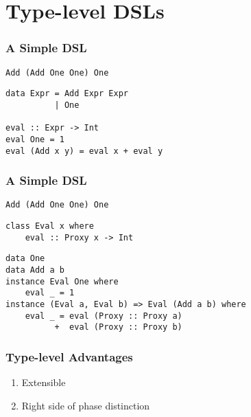 \documentclass{beamer}
\begin{document}
\section{Type-level DSLs}

\begin{frame}[fragile]
\frametitle{A Simple DSL}

\begin{tcolorbox}
\begin{verbatim}
Add (Add One One) One
\end{verbatim}
\end{tcolorbox} \pause

\begin{verbatim}
data Expr = Add Expr Expr
          | One

eval :: Expr -> Int
eval One = 1
eval (Add x y) = eval x + eval y
\end{verbatim}
\end{frame}



\begin{frame}[fragile]
\frametitle{A Simple DSL}

\begin{tcolorbox}
\begin{verbatim}
Add (Add One One) One
\end{verbatim}
\end{tcolorbox}

\begin{verbatim}
class Eval x where
    eval :: Proxy x -> Int
\end{verbatim}
\pause
\begin{verbatim}
data One
data Add a b
instance Eval One where
    eval _ = 1
instance (Eval a, Eval b) => Eval (Add a b) where
    eval _ = eval (Proxy :: Proxy a)
          +  eval (Proxy :: Proxy b)
\end{verbatim}
\end{frame}


\begin{frame}
\frametitle{Type-level Advantages}
\begin{enumerate}
\item Extensible \pause
\item Right side of phase distinction
\end{enumerate}
\end{frame}
\end{document}
